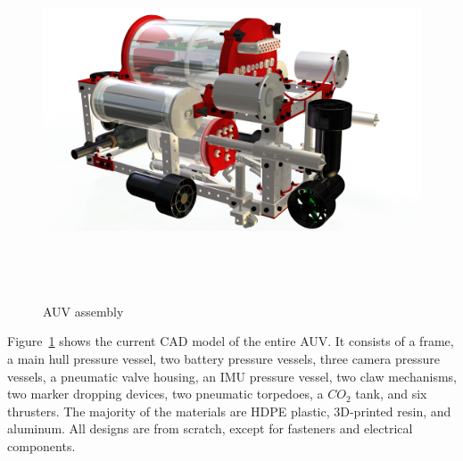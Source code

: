 \documentclass[12pt, landscape]{article}
\begin{document}
\begin{samepage}
\begin{figure}[H]
\centering
\includegraphics[height=4.2in]{media/full_assembly.png}
\caption{AUV assembly}
\label{auv_assembly}
\end{figure}

Figure~\ref{auv_assembly} shows the current CAD model of the entire AUV. It consists of a frame, a main hull pressure vessel, two battery pressure vessels, three camera pressure vessels, a pneumatic valve housing, an IMU pressure vessel, two claw mechanisms, two marker dropping devices, two pneumatic torpedoes, a $CO_2$ tank, and six thrusters.  The majority of the materials are HDPE plastic, 3D-printed resin, and aluminum.  All designs are from scratch, except for fasteners and electrical components. 
\end{samepage}
\end{document}
